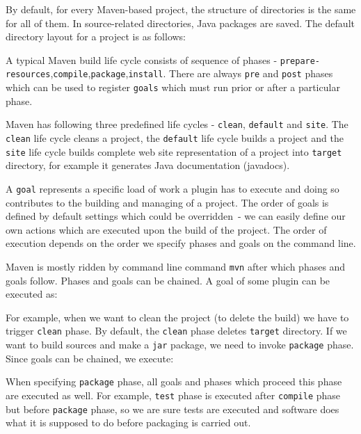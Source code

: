 \documentclass[12pt,final,oneside]{fithesis}
\begin{document}
By default, for every Maven-based project, the structure of directories is the same for all of them. 
In source-related directories, Java packages are saved. The default directory layout for a project is as follows:



A typical Maven build life cycle consists of sequence of phases - \texttt{prepare-resources},\texttt{compile},\texttt{package},\texttt{install}. There are always \texttt{pre} and \texttt{post} phases which can be used to register \texttt{goals} which must run prior or after a particular phase.

Maven has following three predefined life cycles - \texttt{clean}, \texttt{default} and \texttt{site}. The \texttt{clean} life cycle cleans a project, the \texttt{default} life cycle builds a project and the \texttt{site} life cycle builds complete web site representation of a project into \texttt{target} directory, for example it generates Java documentation (javadocs).

A \texttt{goal} represents a specific load of work a plugin has to execute and doing so contributes to the building and managing of a project. The order of goals is defined by default settings which could be overridden~- we can easily define our own actions which are executed upon the build of the project. The order of execution depends on the order we specify phases and goals on the command line.

Maven is mostly ridden by command line command \texttt{mvn} after which phases and goals follow. Phases and 
goals can be chained. A goal of some plugin can be executed as:



For example, when we want to clean the project (to delete the build) we have to trigger \texttt{clean} phase. By default, the \texttt{clean} phase deletes \texttt{target} directory. If we want to build sources and make a \texttt{jar} package, we need to invoke \texttt{package} phase. Since goals can be chained, we execute:



When specifying \texttt{package} phase, all goals and phases which proceed this phase are executed as well. For example, \texttt{test} phase is executed after \texttt{compile} phase but before \texttt{package} phase, so we are sure tests are executed and software does what it is supposed to do before packaging is carried out.
\end{document}
